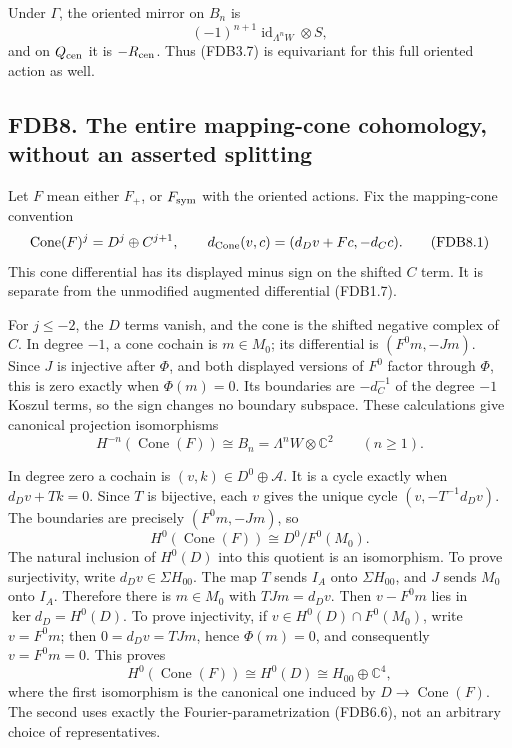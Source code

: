 Under \(\Gamma\), the oriented mirror on \(B_n\) is \[
(-1)^{n+1}\operatorname{id}_{\Lambda^nW}\otimes S,
\tag{FDB7.5}
\] and on \(Q_{\rm cen}\) it is \(-R_{\rm cen}\). Thus (FDB3.7) is
equivariant for this full oriented action as well.

\subsection{FDB8. The entire mapping-cone cohomology, without an
asserted
splitting}\label{fdb8.-the-entire-mapping-cone-cohomology-without-an-asserted-splitting}

Let \(F\) mean either \(F_+\), or \(F_{\rm sym}\) with the oriented
actions. Fix the mapping-cone convention \[
\operatorname{Cone}(F)^j=D^j\oplus C^{j+1},\qquad
d_{\rm Cone}(v,c)=(d_Dv+Fc,-d_Cc).
\tag{FDB8.1}
\] This cone differential has its displayed minus sign on the shifted
\(C\) term. It is separate from the unmodified augmented differential
(FDB1.7).

For \(j\le-2\), the \(D\) terms vanish, and the cone is the shifted
negative complex of \(C\). In degree \(-1\), a cone cochain is
\(m\in M_0\); its differential is \((F^0m,-Jm)\). Since \(J\) is
injective after \(\Phi\), and both displayed versions of \(F^0\) factor
through \(\Phi\), this is zero exactly when \(\Phi(m)=0\). Its
boundaries are \(-d_C^{-1}\) of the degree \(-1\) Koszul terms, so the
sign changes no boundary subspace. These calculations give canonical
projection isomorphisms \[
H^{-n}(\operatorname{Cone}(F))\cong B_n
=\Lambda^nW\otimes\mathbb C^2\qquad(n\ge1).
\tag{FDB8.2}
\]

In degree zero a cochain is \((v,k)\in D^0\oplus\mathcal A\). It is a
cycle exactly when \(d_Dv+Tk=0\). Since \(T\) is bijective, each \(v\)
gives the unique cycle \((v,-T^{-1}d_Dv)\). The boundaries are precisely
\((F^0m,-Jm)\), so \[
H^0(\operatorname{Cone}(F))\cong D^0/F^0(M_0).
\tag{FDB8.3}
\] The natural inclusion of \(H^0(D)\) into this quotient is an
isomorphism. To prove surjectivity, write \(d_Dv\in\Sigma H_{00}\). The
map \(T\) sends \(I_A\) onto \(\Sigma H_{00}\), and \(J\) sends \(M_0\)
onto \(I_A\). Therefore there is \(m\in M_0\) with \(TJm=d_Dv\). Then
\(v-F^0m\) lies in \(\ker d_D=H^0(D)\). To prove injectivity, if
\(v\in H^0(D)\cap F^0(M_0)\), write \(v=F^0m\); then \(0=d_Dv=TJm\),
hence \(\Phi(m)=0\), and consequently \(v=F^0m=0\). This proves \[
H^0(\operatorname{Cone}(F))\cong H^0(D)
\cong H_{00}\oplus\mathbb C^4,
\tag{FDB8.4}
\] where the first isomorphism is the canonical one induced by
\(D\to\operatorname{Cone}(F)\). The second uses exactly the
Fourier-parametrization (FDB6.6), not an arbitrary choice of
representatives.

